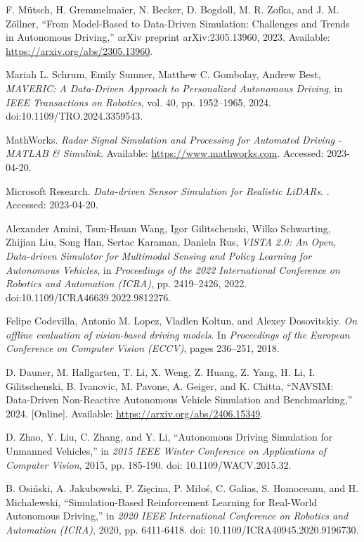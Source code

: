 \documentclass[lettersize,journal]{IEEEtran}
\begin{document}
\begin{thebibliography}{1}
F. Mütsch, H. Gremmelmaier, N. Becker, D. Bogdoll, M. R. Zofka, and J. M. Zöllner, ``From Model-Based to Data-Driven Simulation: Challenges and Trends in Autonomous Driving,'' arXiv preprint arXiv:2305.13960, 2023. Available: \url{https://arxiv.org/abs/2305.13960}.

Mariah L. Schrum, Emily Sumner, Matthew C. Gombolay, Andrew Best,
\textit{MAVERIC: A Data-Driven Approach to Personalized Autonomous Driving}, in \textit{IEEE Transactions on Robotics}, vol. 40, pp. 1952--1965, 2024.
doi:10.1109/TRO.2024.3359543.

MathWorks.
\newblock \emph{Radar Signal Simulation and Processing for Automated Driving - MATLAB \& Simulink}.
\newblock Available: \url{https://www.mathworks.com}. Accessed: 2023-04-20.

Microsoft Research.
\newblock \emph{Data-driven Sensor Simulation for Realistic LiDARs}.
. Accessed: 2023-04-20.

Alexander Amini, Tsun-Hsuan Wang, Igor Gilitschenski, Wilko Schwarting, Zhijian Liu, Song Han, Sertac Karaman, Daniela Rus,
\textit{VISTA 2.0: An Open, Data-driven Simulator for Multimodal Sensing and Policy Learning for Autonomous Vehicles}, in \textit{Proceedings of the 2022 International Conference on Robotics and Automation (ICRA)}, pp. 2419--2426, 2022.
doi:10.1109/ICRA46639.2022.9812276.

Felipe Codevilla, Antonio M. Lopez, Vladlen Koltun, and Alexey Dosovitskiy.
\newblock \emph{On offline evaluation of vision-based driving models}.
\newblock In \emph{Proceedings of the European Conference on Computer Vision (ECCV)}, pages 236--251, 2018.

D. Dauner, M. Hallgarten, T. Li, X. Weng, Z. Huang, Z. Yang, H. Li, I. Gilitschenski, B. Ivanovic, M. Pavone, A. Geiger, and K. Chitta, ``NAVSIM: Data-Driven Non-Reactive Autonomous Vehicle Simulation and Benchmarking,'' 2024. [Online]. Available: \url{https://arxiv.org/abs/2406.15349}.

D. Zhao, Y. Liu, C. Zhang, and Y. Li, ``Autonomous Driving Simulation for Unmanned Vehicles,'' in \textit{2015 IEEE Winter Conference on Applications of Computer Vision}, 2015, pp. 185-190. doi: 10.1109/WACV.2015.32.

B. Osiński, A. Jakubowski, P. Zięcina, P. Miłoś, C. Galias, S. Homoceanu, and H. Michalewski, ``Simulation-Based Reinforcement Learning for Real-World Autonomous Driving,'' in \textit{2020 IEEE International Conference on Robotics and Automation (ICRA)}, 2020, pp. 6411-6418. doi: 10.1109/ICRA40945.2020.9196730.



\end{thebibliography}
\end{document}
